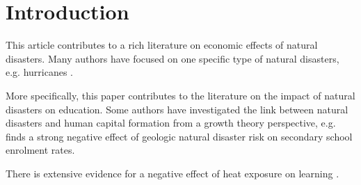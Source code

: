 
\section{Introduction}

This article contributes to a rich literature on economic effects of natural disasters. Many authors have focused on one specific type of natural disasters, e.g. hurricanes \citep{Deryugina_2017, Deryugina_2018}. 

More specifically, this paper contributes to the literature on the impact of natural disasters on education. Some authors have investigated the link between natural disasters and human capital formation from a growth theory perspective, e.g. \cite{Cuaresma_2010} finds a strong negative effect of geologic natural disaster risk on secondary school enrolment rates. 

There is extensive evidence for a negative effect of heat exposure on learning \cite[e.g.][]{Goodman_2020, Park_2020}.